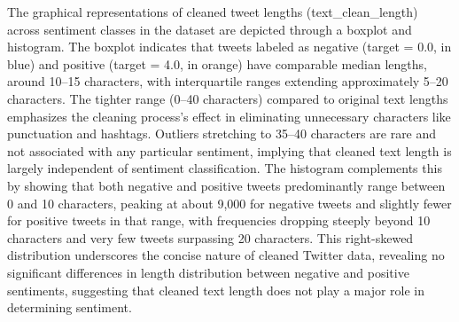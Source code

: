 The graphical representations of cleaned tweet lengths (text\_clean\_length) across sentiment classes in the dataset are depicted through a boxplot and histogram. The boxplot indicates that tweets labeled as negative (target = 0.0, in blue) and positive (target = 4.0, in orange) have comparable median lengths, around 10–15 characters, with interquartile ranges extending approximately 5–20 characters. The tighter range (0–40 characters) compared to original text lengths emphasizes the cleaning process’s effect in eliminating unnecessary characters like punctuation and hashtags. Outliers stretching to 35–40 characters are rare and not associated with any particular sentiment, implying that cleaned text length is largely independent of sentiment classification. The histogram complements this by showing that both negative and positive tweets predominantly range between 0 and 10 characters, peaking at about 9,000 for negative tweets and slightly fewer for positive tweets in that range, with frequencies dropping steeply beyond 10 characters and very few tweets surpassing 20 characters. This right-skewed distribution underscores the concise nature of cleaned Twitter data, revealing no significant differences in length distribution between negative and positive sentiments, suggesting that cleaned text length does not play a major role in determining sentiment.

